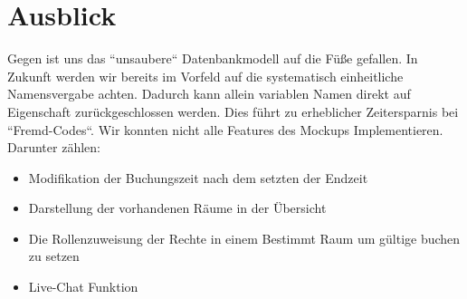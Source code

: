 \section{Ausblick}
Gegen ist uns das “unsaubere“ Datenbankmodell auf die Füße gefallen. 
In Zukunft werden wir bereits im Vorfeld auf die systematisch einheitliche Namensvergabe achten. 
Dadurch kann allein variablen Namen direkt auf Eigenschaft zurückgeschlossen werden.
 Dies führt zu erheblicher Zeitersparnis bei “Fremd-Codes“. Wir konnten nicht alle Features des Mockups Implementieren. \\
 Darunter zählen:
\begin{itemize}
    \item	Modifikation der Buchungszeit nach dem setzten der Endzeit
    \item	Darstellung der vorhandenen Räume in der Übersicht
    \item	Die Rollenzuweisung der Rechte in einem Bestimmt Raum um gültige buchen zu setzen 
    \item	Live-Chat Funktion  
\end{itemize}
